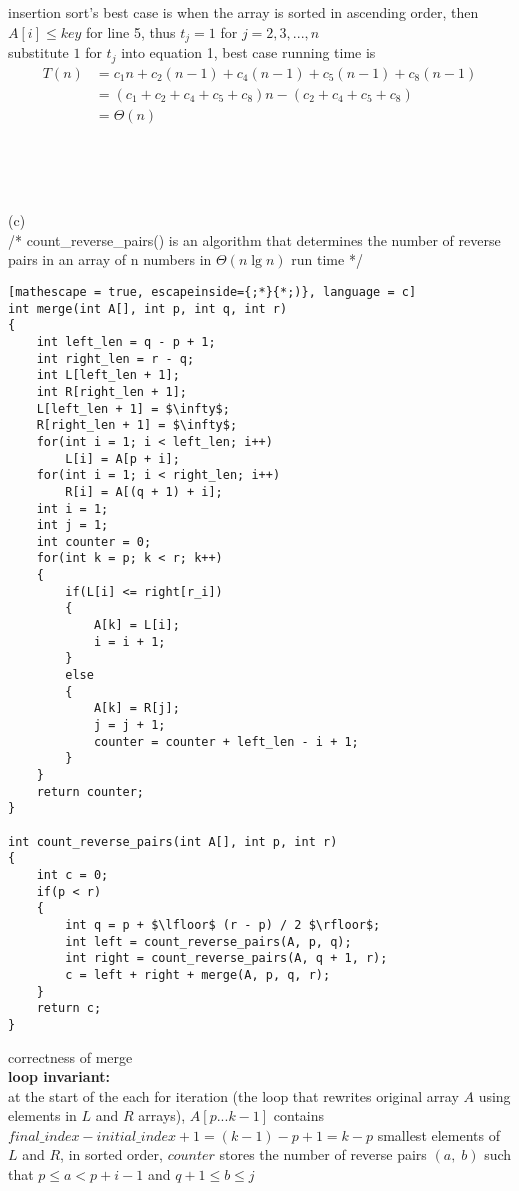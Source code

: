 \documentclass[12pt,border=4pt,multi]{article}%
\begin{document}
\\
\\
insertion sort's best case is when the array is sorted in ascending order, then $A[i] \leqslant key$ for line 5, thus $t_j = 1$ for $j = 2,3,...,n$\\ 
substitute $1$ for $t_j$ into equation 1, best case running time is
\begin{align*}
    T(n) &= c_1 n + c_2 (n - 1) + c_4 (n - 1) + c_5(n - 1) + c_8 (n - 1)\\
    &= (c_1 + c_2 + c_4 + c_5 + c_8)n - (c_2 + c_4 + c_5 + c_8)\\
    &= \Theta(n)\\
\end{align*}
\\
\\
\\
\\
(c)\\
/* count\_reverse\_pairs() is an algorithm that determines the number of reverse pairs in an array of n numbers in $\Theta(n \lg n)$ run time */
\begin{lstlisting}[mathescape = true, escapeinside={;*}{*;)}, language = c]
int merge(int A[], int p, int q, int r)
{
    int left_len = q - p + 1; 
    int right_len = r - q;
    int L[left_len + 1];
    int R[right_len + 1];
    L[left_len + 1] = $\infty$;
    R[right_len + 1] = $\infty$;
    for(int i = 1; i < left_len; i++)
        L[i] = A[p + i];
    for(int i = 1; i < right_len; i++)
        R[i] = A[(q + 1) + i];
    int i = 1;
    int j = 1;
    int counter = 0;
    for(int k = p; k < r; k++)
    {
        if(L[i] <= right[r_i])
        {
            A[k] = L[i];
            i = i + 1;
        }
        else
        {
            A[k] = R[j];
            j = j + 1;
            counter = counter + left_len - i + 1;
        }
    }
    return counter;
}

int count_reverse_pairs(int A[], int p, int r)
{
    int c = 0;
    if(p < r)
    {
        int q = p + $\lfloor$ (r - p) / 2 $\rfloor$;
        int left = count_reverse_pairs(A, p, q);
        int right = count_reverse_pairs(A, q + 1, r);
        c = left + right + merge(A, p, q, r);
    }
    return c;
}
\end{lstlisting}
\newpage
\noindent
correctness of merge\\
\textbf{loop invariant:}\\
at the start of the each for iteration (the loop that rewrites original array $A$ using elements in $L$ and $R$ arrays), $A[p...k - 1]$ contains $final\_index - initial\_index + 1 = (k - 1) - p + 1 = k - p$ smallest elements of $L$ and $R$, in sorted order, $counter$ stores the number of reverse pairs $(a,\;b)$ such that $p \leq a < p + i - 1$ and $q + 1 \leq b \leq j$\\
\end{document}
